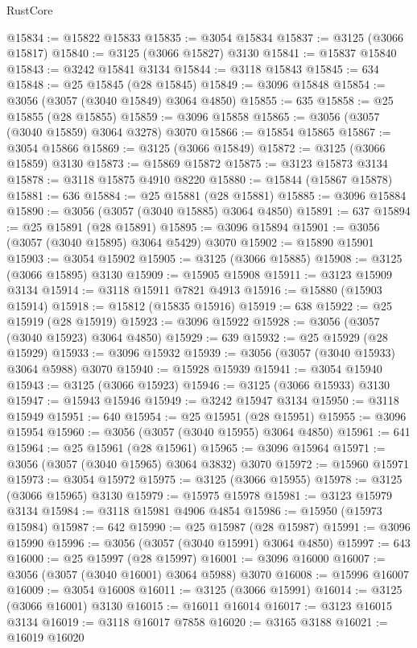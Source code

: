 \begin{lexlean}{RustCore}
\begin{coremodule}
@15834 := @15822 @15833
@15835 := @3054 @15834
@15837 := @3125 (@3066 @15817)
@15840 := @3125 (@3066 @15827) @3130
@15841 := @15837 @15840
@15843 := @3242 @15841 @3134
@15844 := @3118 @15843
@15845 := 634
@15848 := @25 @15845 (@28 @15845)
@15849 := @3096 @15848
@15854 := @3056 (@3057 (@3040 @15849) @3064 @4850)
@15855 := 635
@15858 := @25 @15855 (@28 @15855)
@15859 := @3096 @15858
@15865 := @3056 (@3057 (@3040 @15859) @3064 @3278) @3070
@15866 := @15854 @15865
@15867 := @3054 @15866
@15869 := @3125 (@3066 @15849)
@15872 := @3125 (@3066 @15859) @3130
@15873 := @15869 @15872
@15875 := @3123 @15873 @3134
@15878 := @3118 @15875 @4910 @8220
@15880 := @15844 (@15867 @15878)
@15881 := 636
@15884 := @25 @15881 (@28 @15881)
@15885 := @3096 @15884
@15890 := @3056 (@3057 (@3040 @15885) @3064 @4850)
@15891 := 637
@15894 := @25 @15891 (@28 @15891)
@15895 := @3096 @15894
@15901 := @3056 (@3057 (@3040 @15895) @3064 @5429) @3070
@15902 := @15890 @15901
@15903 := @3054 @15902
@15905 := @3125 (@3066 @15885)
@15908 := @3125 (@3066 @15895) @3130
@15909 := @15905 @15908
@15911 := @3123 @15909 @3134
@15914 := @3118 @15911 @7821 @4913
@15916 := @15880 (@15903 @15914)
@15918 := @15812 (@15835 @15916)
@15919 := 638
@15922 := @25 @15919 (@28 @15919)
@15923 := @3096 @15922
@15928 := @3056 (@3057 (@3040 @15923) @3064 @4850)
@15929 := 639
@15932 := @25 @15929 (@28 @15929)
@15933 := @3096 @15932
@15939 := @3056 (@3057 (@3040 @15933) @3064 @5988) @3070
@15940 := @15928 @15939
@15941 := @3054 @15940
@15943 := @3125 (@3066 @15923)
@15946 := @3125 (@3066 @15933) @3130
@15947 := @15943 @15946
@15949 := @3242 @15947 @3134
@15950 := @3118 @15949
@15951 := 640
@15954 := @25 @15951 (@28 @15951)
@15955 := @3096 @15954
@15960 := @3056 (@3057 (@3040 @15955) @3064 @4850)
@15961 := 641
@15964 := @25 @15961 (@28 @15961)
@15965 := @3096 @15964
@15971 := @3056 (@3057 (@3040 @15965) @3064 @3832) @3070
@15972 := @15960 @15971
@15973 := @3054 @15972
@15975 := @3125 (@3066 @15955)
@15978 := @3125 (@3066 @15965) @3130
@15979 := @15975 @15978
@15981 := @3123 @15979 @3134
@15984 := @3118 @15981 @4906 @4854
@15986 := @15950 (@15973 @15984)
@15987 := 642
@15990 := @25 @15987 (@28 @15987)
@15991 := @3096 @15990
@15996 := @3056 (@3057 (@3040 @15991) @3064 @4850)
@15997 := 643
@16000 := @25 @15997 (@28 @15997)
@16001 := @3096 @16000
@16007 := @3056 (@3057 (@3040 @16001) @3064 @5988) @3070
@16008 := @15996 @16007
@16009 := @3054 @16008
@16011 := @3125 (@3066 @15991)
@16014 := @3125 (@3066 @16001) @3130
@16015 := @16011 @16014
@16017 := @3123 @16015 @3134
@16019 := @3118 @16017 @7858
@16020 := @3165 @3188
@16021 := @16019 @16020

\end{coremodule}
\end{lexlean}
